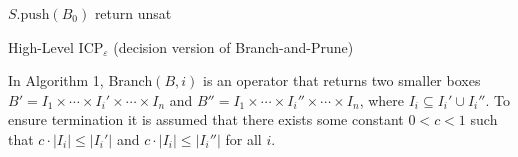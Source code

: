 \documentclass[prodmode]{acmsmall} %
\begin{document}
\begin{algorithm}\label{algo1}
\BlankLine
$S.\mathrm{push}(B_0)$\;
\While{$S\neq \emptyset$}{\label{while}
$B\leftarrow S.\mathrm{pop}()$ \;
\While{$\exists 1\leq i \leq m, B\neq \mathrm{Prune}(B,f_i)$}{ 
	$B\leftarrow\mathrm{Prune}(B, f_i)$ \;
}
\If{$B\neq \emptyset$}
{\eIf{$\exists 1\leq i\leq n, |I_i|\geq \varepsilon$}{$\{B_1,B_2\}\leftarrow \mathrm{Branch}(B, i)$\;$S.\mathrm{push}(\{B_1,B_2\})$\;}{return {\sf sat}\;}}
}
return {\sf unsat}\;
\caption{High-Level ICP$_{\varepsilon}$ (decision version of Branch-and-Prune)}
\end{algorithm}
In Algorithm 1, Branch$(B,i)$ is an operator that returns two smaller boxes $B' = I_1\times\cdots\times I_i'\times\cdots\times I_n$ and $B''=I_1\times \cdots\times I_i''\times \cdots\times I_n$, where $I_i\subseteq I_i'\cup I_i''$. To ensure termination it is assumed that there exists some constant $0<c<1$ such that $c\cdot |I_i|\leq |I_i'|$ and $c\cdot |I_i|\leq |I_i''|$ for all $i$.

\end{document}
